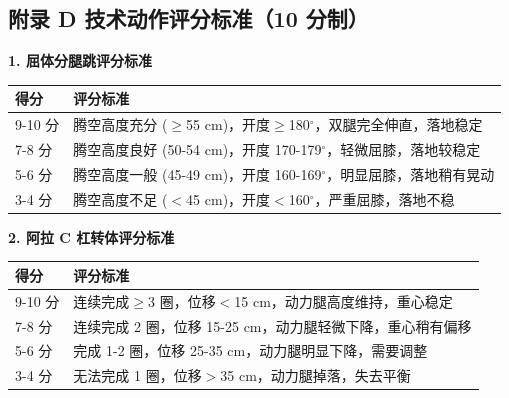 \documentclass[a4paper,12pt]{article}
\begin{document}
\clearpage
\newpage
\subsection*{附录 D 技术动作评分标准（10 分制）}

\noindent\textbf{1. 屈体分腿跳评分标准}

\begin{table}[H]
	\centering
	\begin{tabularx}{\textwidth}{lX}
		\toprule
		得分     & 评分标准                                               \\
		\midrule
		9-10 分 & 腾空高度充分 ($\ge$55 cm)，开度$\ge$180$^\circ$，双腿完全伸直，落地稳定 \\
		7-8 分  & 腾空高度良好 (50-54 cm)，开度 170-179$^\circ$，轻微屈膝，落地较稳定    \\
		5-6 分  & 腾空高度一般 (45-49 cm)，开度 160-169$^\circ$，明显屈膝，落地稍有晃动   \\
		3-4 分  & 腾空高度不足 ($<$45 cm)，开度$<$160$^\circ$，严重屈膝，落地不稳       \\
		\bottomrule
	\end{tabularx}
\end{table}

\noindent\textbf{2. 阿拉 C 杠转体评分标准}

\begin{table}[H]
	\centering
	\begin{tabularx}{\textwidth}{lX}
		\toprule
		得分     & 评分标准                                 \\
		\midrule
		9-10 分 & 连续完成$\ge$3 圈，位移$<$15 cm，动力腿高度维持，重心稳定 \\
		7-8 分  & 连续完成 2 圈，位移 15-25 cm，动力腿轻微下降，重心稍有偏移  \\
		5-6 分  & 完成 1-2 圈，位移 25-35 cm，动力腿明显下降，需要调整    \\
		3-4 分  & 无法完成 1 圈，位移$>$35 cm，动力腿掉落，失去平衡       \\
		\bottomrule
	\end{tabularx}
\end{table}
\end{document}
